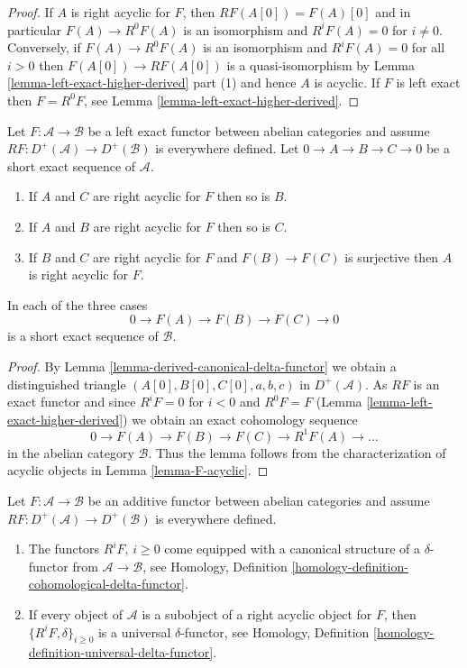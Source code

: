 \begin{proof}
If $A$ is right acyclic for $F$, then $RF(A[0]) = F(A)[0]$ and in
particular $F(A) \to R^0F(A)$ is an isomorphism and
$R^iF(A) = 0$ for $i \not = 0$. Conversely, if $F(A) \to R^0F(A)$
is an isomorphism and $R^iF(A) = 0$ for all $i > 0$ then
$F(A[0]) \to RF(A[0])$ is a quasi-isomorphism by
Lemma \ref{lemma-left-exact-higher-derived} part (1)
and hence $A$ is acyclic. If $F$ is left exact then $F = R^0F$, see
Lemma \ref{lemma-left-exact-higher-derived}.
\end{proof}

\begin{lemma}
\label{lemma-F-acyclic-ses}
Let $F : \mathcal{A} \to \mathcal{B}$ be a left exact functor
between abelian categories and assume
$RF : D^{+}(\mathcal{A}) \to D^{+}(\mathcal{B})$ is everywhere
defined. Let $0 \to A \to B \to C \to 0$ be a short exact sequence
of $\mathcal{A}$.
\begin{enumerate}
\item If $A$ and $C$ are right acyclic for $F$ then so is $B$.
\item If $A$ and $B$ are right acyclic for $F$ then so is $C$.
\item If $B$ and $C$ are right acyclic for $F$ and $F(B) \to F(C)$ is
surjective then $A$ is right acyclic for $F$.
\end{enumerate}
In each of the three cases
$$
0 \to F(A) \to F(B) \to F(C) \to 0
$$
is a short exact sequence of $\mathcal{B}$.
\end{lemma}

\begin{proof}
By
Lemma \ref{lemma-derived-canonical-delta-functor}
we obtain a distinguished triangle
$(A[0], B[0], C[0], a, b, c)$ in $D^{+}(\mathcal{A})$.
As $RF$ is an exact functor and since
$R^iF = 0$ for $i < 0$ and $R^0F = F$
(Lemma \ref{lemma-left-exact-higher-derived})
we obtain an exact cohomology sequence
$$
0 \to F(A) \to F(B) \to F(C) \to R^1F(A) \to \ldots
$$
in the abelian category $\mathcal{B}$. Thus the lemma follows from
the characterization of acyclic objects in
Lemma \ref{lemma-F-acyclic}.
\end{proof}

\begin{lemma}
\label{lemma-right-derived-delta-functor}
Let $F : \mathcal{A} \to \mathcal{B}$ be an additive functor
between abelian categories and assume
$RF : D^{+}(\mathcal{A}) \to D^{+}(\mathcal{B})$ is everywhere defined.
\begin{enumerate}
\item The functors $R^iF$, $i \geq 0$ come equipped with a canonical
structure of a $\delta$-functor from $\mathcal{A} \to \mathcal{B}$, see
Homology, Definition \ref{homology-definition-cohomological-delta-functor}.
\item If every object of $\mathcal{A}$ is a subobject of a right
acyclic object for $F$, then $\{R^iF, \delta\}_{i \geq 0}$ is a
universal $\delta$-functor, see
Homology, Definition \ref{homology-definition-universal-delta-functor}.
\end{enumerate}
\end{lemma}

